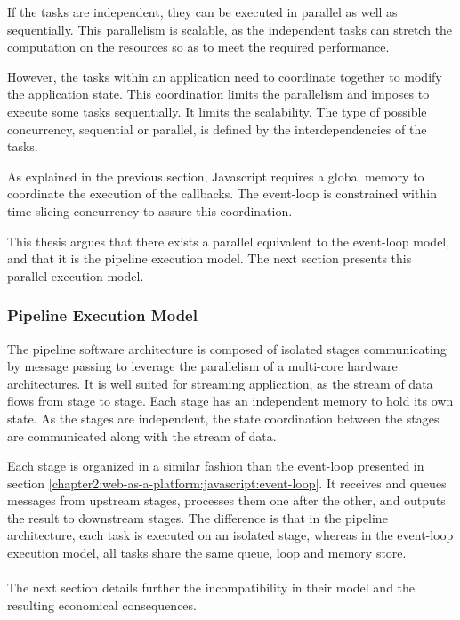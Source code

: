If the tasks are independent, they can be executed in parallel as well as sequentially.
This parallelism is scalable, as the independent tasks can stretch the computation on the resources so as to meet the required performance.

However, the tasks within an application need to coordinate together to modify the application state.
This coordination limits the parallelism and imposes to execute some tasks sequentially.
It limits the scalability.
The type of possible concurrency, sequential or parallel, is defined by the interdependencies of the tasks.

As explained in the previous section, Javascript requires a global memory to coordinate the execution of the callbacks.
The event-loop is constrained within time-slicing concurrency to assure this coordination.

This thesis argues that there exists a parallel equivalent to the event-loop model, and that it is the pipeline execution model.
The next section presents this parallel execution model.

\subsubsection{Pipeline Execution Model}

The pipeline software architecture is composed of isolated stages communicating by message passing to leverage the parallelism of a multi-core hardware architectures.
It is well suited for streaming application, as the stream of data flows from stage to stage.
Each stage has an independent memory to hold its own state.
As the stages are independent, the state coordination between the stages are communicated along with the stream of data.


Each stage is organized in a similar fashion than the event-loop presented in section \ref{chapter2:web-as-a-platform:javascript:event-loop}.
It receives and queues messages from upstream stages, processes them one after the other, and outputs the result to downstream stages.
The difference is that in the pipeline architecture, each task is executed on an isolated stage, whereas in the event-loop execution model, all tasks share the same queue, loop and memory store.

\paragraph{}

The next section details further the incompatibility in their model and the resulting economical consequences.
